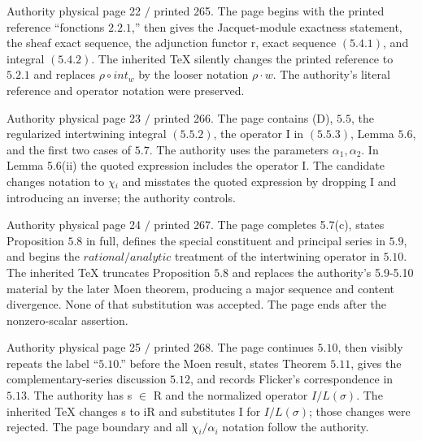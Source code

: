 \documentclass[10pt,a4paper]{article}
\begin{document}
\clearpage
{}
\label{d035-physical-022}
\par Authority physical page 22 $/$ printed 265. The page begins with the printed reference ``fonctions $2.2.1$,'' then gives the Jacquet-module exactness statement, the sheaf exact sequence, the adjunction functor r, exact sequence $(5.4.1)$, and integral $(5.4.2)$. The inherited TeX silently changes the printed reference to $5.2.1$ and replaces $\rho{}∘int_w$ by the looser notation $\rho{}\cdot{}w$. The authority's literal reference and operator notation were preserved.\par

\clearpage
{}
\label{d035-physical-023}
\par Authority physical page 23 $/$ printed 266. The page contains (D), $5.5$, the regularized intertwining integral $(5.5.2)$, the operator I in $(5.5.3)$, Lemma $5.6$, and the first two cases of $5.7$. The authority uses the parameters $\alpha{}_1,\alpha{}_2$. In Lemma 5.6(ii) the quoted expression includes the operator I. The candidate changes notation to $\chi{}_i$ and misstates the quoted expression by dropping I and introducing an inverse; the authority controls.\par

\clearpage
{}
\label{d035-physical-024}
\par Authority physical page 24 $/$ printed 267. The page completes 5.7(c), states Proposition $5.8$ in full, defines the special constituent and principal series in $5.9$, and begins the $rational/analytic$ treatment of the intertwining operator in $5.10$. The inherited TeX truncates Proposition $5.8$ and replaces the authority's 5.9-5.10 material by the later Moen theorem, producing a major sequence and content divergence. None of that substitution was accepted. The page ends after the nonzero-scalar assertion.\par

\clearpage
{}
\label{d035-physical-025}
\par Authority physical page 25 $/$ printed 268. The page continues $5.10$, then visibly repeats the label ``$5.10$.'' before the Moen result, states Theorem $5.11$, gives the complementary-series discussion $5.12$, and records Flicker's correspondence in $5.13$. The authority has s $\in{}$ R and the normalized operator $I/L(\sigma{})$. The inherited TeX changes s to iR and substitutes I for $I/L(\sigma{})$; those changes were rejected. The page boundary and all $\chi{}_i/\alpha{}_i$ notation follow the authority.\par
\end{document}
